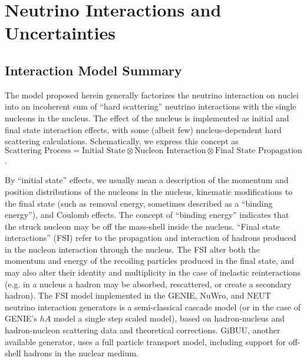 \section{Neutrino Interactions and Uncertainties}\label{sec:nu-osc-05} \label{sec:physics-lbnosc-nuint}

\subsection{Interaction Model Summary}
  
The model proposed herein generally factorizes the neutrino
interaction on nuclei into an incoherent sum of ``hard scattering'' neutrino interactions with the single nucleons in the nucleus. The effect of the nucleus is implemented as
initial and final state interaction effects, with some (albeit few) nucleus-dependent hard scattering calculations. Schematically, we express this concept as $\text{Scattering Process} = \text{Initial State} \otimes \text{Nucleon Interaction} \otimes \text{Final State Propagation}$.


By ``initial state'' effects, we usually mean a description of the momentum and position distributions of the nucleons in the nucleus, kinematic modifications to the final state (such as removal energy, sometimes described as a ``binding energy''), and Coulomb effects.   The concept of ``binding energy'' indicates that the struck nucleon may be off the mass-shell inside the nucleus.  
``Final state interactions'' (FSI) refer to the propagation and interaction of hadrons produced in the nucleon interaction through the nucleus. The FSI alter both the momentum and energy of the recoiling particles produced in the final state, and may also alter their identity and multiplicity in the case of inelastic reinteractions (e.g. in a nucleus a hadron may be absorbed, rescattered, or create a secondary hadron).  The FSI model implemented in the GENIE, NuWro, and NEUT neutrino interaction generators is a semi-classical cascade model (or in the case of GENIE's $hA$ model a single step scaled model), based on hadron-nucleus and hadron-nucleon scattering data and theoretical corrections.  GiBUU, another available generator, uses a full particle transport model, including support for off-shell hadrons in the nuclear medium.

